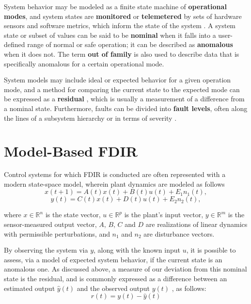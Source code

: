 System behavior may be modeled as a finite state machine of \textbf{operational modes}, and system states are \textbf{monitored} or \textbf{telemetered} by sets of hardware sensors and software metrics, which inform the state of the system \cite{dearden2004real}. A system state or subset of values can be said to be \textbf{nominal} when it falls into a user-defined range of normal or safe operation; it can be described as \textbf{anomalous} when it does not. The term \textbf{out of family} is also used to describe data that is specifically anomalous for a certain operational mode.

System models may include ideal or expected behavior for a given operation mode, and a method for comparing the current state to the expected mode can be expressed as a \textbf{residual} \cite{hwang2010survey}, which is usually a measurement of a difference from a nominal state. Furthermore, faults can be divided into \textbf{fault levels}, often along the lines of a subsystem hierarchy or in terms of severity \cite{tipaldi2014spacecraft}.

\section{Model-Based FDIR}

Control systems for which FDIR is conducted are often represented with a modern state-space model, wherein plant dynamics are modeled as follows \cite{hwang2010survey}
\begin{equation} \label{eq:plant_model1}
    x(t+1) = A(t) x(t) + B(t) u(t) + E_{1}n_{1}(t),
\end{equation}
\begin{equation} \label{eq:plant_model2}
    y(t) = C(t) x(t) + D(t) u(t) + E_{2}n_{2}(t),
\end{equation}

where $x \in \mathbb{R}^{n}$ is the state vector, $u \in \mathbb{R}^{p}$ is the plant's input vector, $y \in \mathbb{R}^{m}$ is the sensor-measured output vector, $A$, $B$, $C$ and $D$ are realizations of linear dynamics with permissible perturbations, and $n_{1}$ and $n_{2}$ are disturbance vectors.

By observing the system via $y$, along with the known input $u$, it is possible to assess, via a model of expected system behavior, if the current state is an anomalous one. As discussed above, a measure of our deviation from this nominal state is the residual, and is commonly expressed as a difference between an estimated output $\hat{y}(t)$ and the observed output $y(t)$ \cite{hwang2010survey}, as follows:
\begin{equation} \label{eq:residual_generation}
r(t) = y(t) - \hat{y}(t)
\end{equation}

